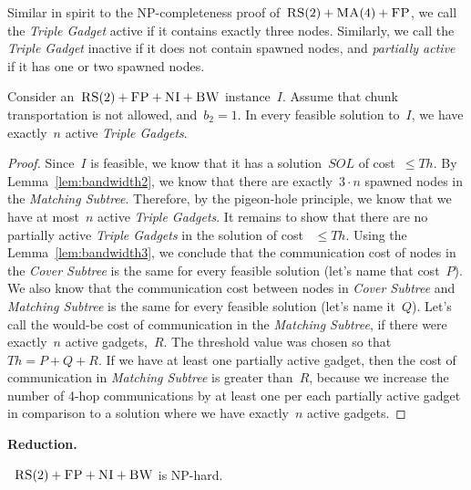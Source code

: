 \documentclass[preprint,12pt]{elsarticle}
\newcommand{\CC}{\textsc{NI}}
\newcommand{\FP}{\textsc{FP}}
\newcommand{\RS}{\textsc{RS}}
\newcommand{\BW}{\textsc{BW}}
\newcommand{\MA}{\textsc{MA}}
\newcommand{\MatchSubtree}{{\emph{Matching Subtree}}}
\newcommand{\CoverSubtree}{{\emph{Cover Subtree}}}
\newcommand{\TripleGadget}{{\emph{Triple Gadget}}}
\newcommand{\TripleGadgets}{{\emph{Triple Gadgets}}}
\newcommand{\CostCom}{\ensuremath{b_2}}
\newcommand{\Thr}{\ensuremath{Th}}
\newcommand{\Sol}{\ensuremath{SOL}}
\begin{document}
Similar in spirit to the NP-completeness proof of~$\RS(2)+\MA(4)+\FP$,
we call the {\TripleGadget} active if it contains exactly three nodes. 
Similarly, we call the {\TripleGadget} inactive if it
does not contain spawned nodes, and \emph{partially active} if it
has one or two
spawned nodes.

\begin{lemma}
  Consider an~$\RS(2)+\FP+\CC+\BW$ instance~$I$.  Assume that 
  chunk transportation is not allowed, and~$\CostCom = 1$.
  In every feasible solution to~$I$, we have exactly~$n$ active
  {\TripleGadgets}.
  \label{lem:full-or-empty}
\end{lemma}

\begin{proof}
  Since~$I$ is feasible, we know that it has a solution~$\Sol$ of
  cost~$\leq \Thr$.
  By Lemma~\ref{lem:bandwidth2}, we know that there are
  exactly~$3\cdot n$ spawned nodes in the {\MatchSubtree}. Therefore, by
  the pigeon-hole principle, we know that we have at most~$n$
  active {\TripleGadgets}. It remains to show that there
  are no partially active {\TripleGadgets} in the solution of cost
 ~$\leq \Thr$.
  Using the Lemma~\ref{lem:bandwidth3}, 
  we conclude that the communication cost of
  nodes in the {\CoverSubtree} is the same for every feasible solution
  (let's name that cost~$P$). We also know that the communication cost
  between nodes in {\CoverSubtree} and {\MatchSubtree} is the same for
  every feasible solution (let's name it~$Q$). Let's call the
  would-be cost of communication in the {\MatchSubtree}, if there were
  exactly~$n$ active gadgets,~$R$.
  The threshold value was chosen so that~$\Thr = P+Q+R$. If we have at least one partially active
  gadget, then the cost of communication in {\MatchSubtree} is greater
  than~$R$, because we increase the number of 4-hop communications by
  at least one per each partially active gadget in comparison to a solution
  where we have exactly~$n$ active gadgets.
\end{proof}

\noindent \textbf{Reduction.}

\begin{theorem}
 ~$\RS(2)+\FP+\CC+\BW$ is NP-hard.
\end{theorem}
\end{document}

